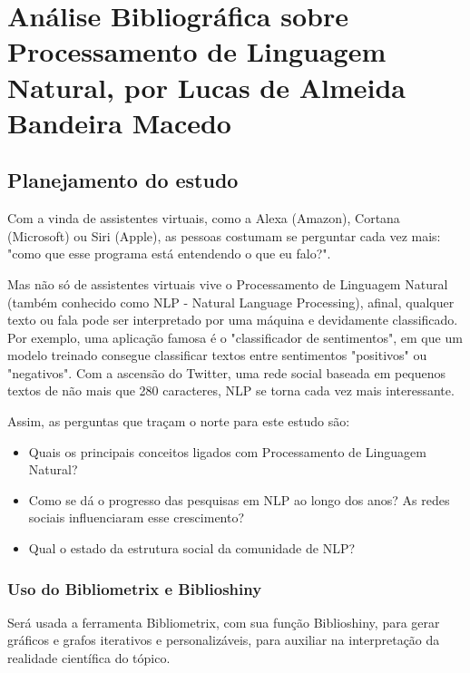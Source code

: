 \chapter{Análise Bibliográfica sobre Processamento de Linguagem Natural, por Lucas de Almeida Bandeira Macedo}

\section{Planejamento do estudo}

Com a vinda de assistentes virtuais, como a Alexa (Amazon), Cortana (Microsoft) ou Siri (Apple), as pessoas costumam se perguntar cada vez mais: "como que esse programa está entendendo o que eu falo?".

Mas não só de assistentes virtuais vive o Processamento de Linguagem Natural (também conhecido como NLP - Natural Language Processing), 
afinal, qualquer texto ou fala pode ser interpretado por uma máquina e devidamente classificado. Por exemplo, uma aplicação famosa é o "classificador de sentimentos", em que um modelo treinado consegue classificar textos entre sentimentos "positivos" ou "negativos". Com a ascensão do Twitter, uma rede social baseada em pequenos textos de não mais que 280 caracteres, NLP se torna cada vez mais interessante.


Assim, as perguntas que traçam o norte para este estudo são:

\begin{itemize}
    \item Quais os principais conceitos ligados com Processamento de Linguagem Natural?
    \item Como se dá o progresso das pesquisas em NLP ao longo dos anos? As redes sociais influenciaram esse crescimento?
    \item Qual o estado da estrutura social da comunidade de NLP?
\end{itemize}

\subsection{Uso do Bibliometrix e Biblioshiny}

Será usada a ferramenta Bibliometrix, com sua função Biblioshiny, para gerar gráficos e grafos iterativos e personalizáveis, para auxiliar na interpretação da realidade científica do tópico.

